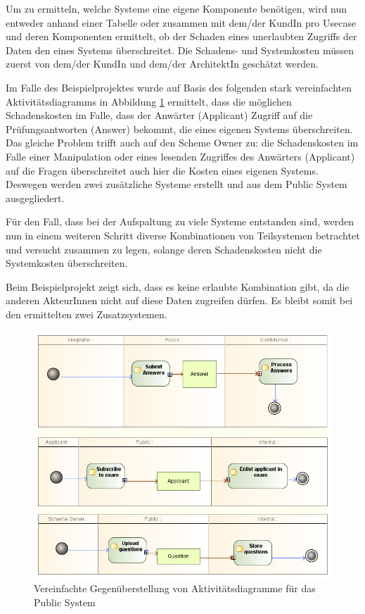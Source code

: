Um zu ermitteln, welche Systeme eine eigene Komponente benötigen, wird nun entweder anhand einer Tabelle oder zusammen mit dem/der KundIn pro Usecase und deren Komponenten ermittelt, ob der Schaden eines unerlaubten Zugriffs der Daten den eines Systems überschreitet. Die Schadens- und Systemkosten müssen zuerst von dem/der KundIn und dem/der ArchitektIn geschätzt werden.

Im Falle des Beispielprojektes wurde auf Basis des folgenden stark vereinfachten Aktivitätsdiagramms in Abbildung \ref{fig:actorarch} ermittelt, dass die möglichen Schadenskosten im Falle, dass der Anwärter (Applicant) Zugriff auf die Prüfungsantworten (Answer) bekommt, die eines eigenen Systems überschreiten. Das gleiche Problem trifft auch auf den Scheme Owner zu: die Schadenskosten im Falle einer Manipulation oder eines lesenden Zugriffes des Anwärters (Applicant) auf die Fragen überschreitet auch hier die Kosten eines eigenen Systems. Deswegen werden zwei zusätzliche Systeme erstellt und aus dem Public System ausgegliedert.

Für den Fall, dass bei der Aufspaltung zu viele Systeme entstanden sind, werden nun in einem weiteren Schritt diverse Kombinationen von Teilsystemen betrachtet und versucht zusammen zu legen, solange deren Schadenskosten nicht die Systemkosten überschreiten.

Beim Beispielprojekt zeigt sich, dass es keine erlaubte Kombination gibt, da die anderen AkteurInnen nicht auf diese Daten zugreifen dürfen. Es bleibt somit bei den ermittelten zwei Zusatzsystemen.

\begin{figure}[H]
    \centering
    \includegraphics[scale=0.6]{uml/actorarch.png}
    \caption{Vereinfachte Gegenüberstellung von Aktivitätsdiagramme für das Public System}
    \label{fig:actorarch}
\end{figure}

